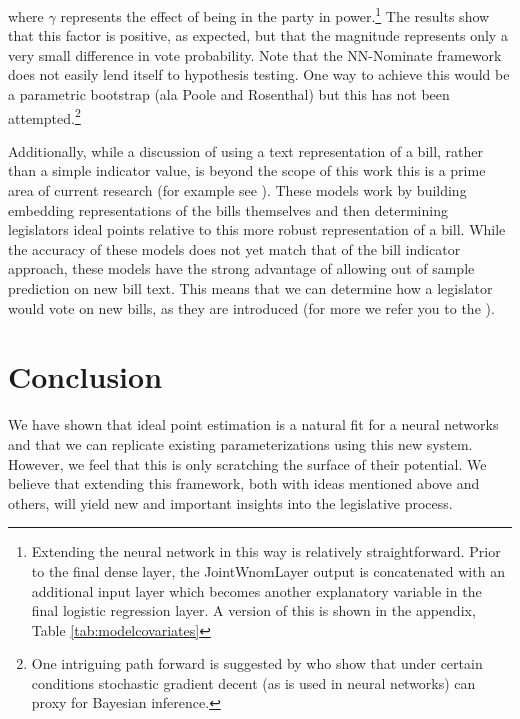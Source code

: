 \documentclass[11pt,]{article}
\begin{document}
\noindent
where \(\gamma\) represents the effect of being in the party in
power.\footnote{Extending the neural network in this way is relatively
  straightforward. Prior to the final dense layer, the JointWnomLayer
  output is concatenated with an additional input layer which becomes
  another explanatory variable in the final logistic regression layer. A
  version of this is shown in the appendix, Table
  \ref{tab:modelcovariates}} The results show that this factor is
positive, as expected, but that the magnitude represents only a very
small difference in vote probability. Note that the NN-Nominate
framework does not easily lend itself to hypothesis testing. One way to
achieve this would be a parametric bootstrap (ala Poole and Rosenthal)
but this has not been attempted.\footnote{One intriguing path forward is
  suggested by \cite{mandt2017stochastic} who show that under certain
  conditions stochastic gradient decent (as is used in neural networks)
  can proxy for Bayesian inference.}

Additionally, while a discussion of using a text representation of a
bill, rather than a simple indicator value, is beyond the scope of this
work this is a prime area of current research (for example see
\cite{kornilova2018party}). These models work by building embedding
representations of the bills themselves and then determining legislators
ideal points relative to this more robust representation of a bill.
While the accuracy of these models does not yet match that of the bill
indicator approach, these models have the strong advantage of allowing
out of sample prediction on new bill text. This means that we can
determine how a legislator would vote on new bills, as they are
introduced (for more we refer you to the \cite{kornilova2018party}).

\section{Conclusion}\label{conclusion}

We have shown that ideal point estimation is a natural fit for a neural
networks and that we can replicate existing parameterizations using this
new system. However, we feel that this is only scratching the surface of
their potential. We believe that extending this framework, both with
ideas mentioned above and others, will yield new and important insights
into the legislative process.

\hypertarget{refs}{}

\clearpage
\end{document}
